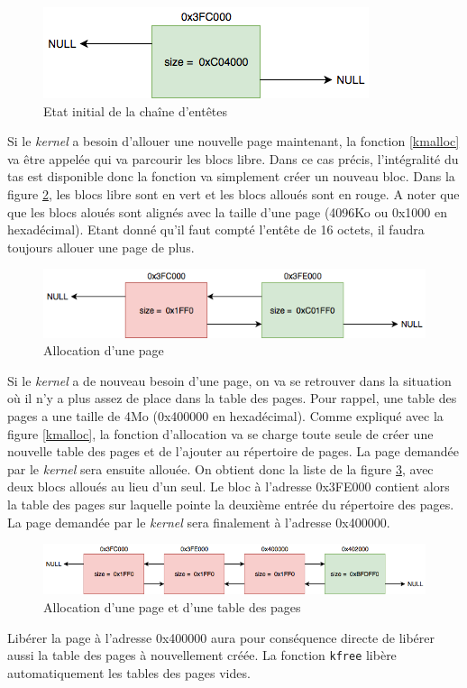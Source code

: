 \begin{figure}[!h]
  \centering
  \includegraphics[scale=0.7]{images/alloc0.png}
  \caption{Etat initial de la chaîne d'entêtes}
  \label{alloc0}
\end{figure}

Si le \textit{kernel} a besoin d'allouer une nouvelle page maintenant, la fonction
\ref{kmalloc} va être appelée qui va parcourir les blocs libre. Dans ce cas précis,
l'intégralité du tas est disponible donc la fonction va simplement créer un nouveau
bloc. Dans la figure \ref{alloc1}, les blocs libre sont en vert et les blocs alloués
sont en rouge. A noter que que les blocs aloués sont alignés avec la taille d'une
page (4096Ko ou 0x1000 en hexadécimal). Etant donné qu'il faut compté l'entête
de 16 octets, il faudra toujours allouer une page de plus.

\begin{figure}[!h]
  \centering
  \includegraphics[scale=0.6]{images/alloc1.png}
  \caption{Allocation d'une page}
  \label{alloc1}
\end{figure}

Si le \textit{kernel} a de nouveau besoin d'une page, on va se retrouver dans la
situation où il n'y a plus assez de place dans la table des pages. Pour rappel,
une table des pages a une taille de 4Mo (0x400000 en hexadécimal). Comme expliqué
avec la figure \ref{kmalloc}, la fonction d'allocation va se charge toute seule
de créer une nouvelle table des pages et de l'ajouter au répertoire de pages.
La page demandée par le \textit{kernel} sera ensuite allouée. On obtient donc
la liste de la figure \ref{alloc2}, avec deux blocs alloués au lieu d'un seul.
Le bloc à l'adresse 0x3FE000 contient alors la table des pages sur laquelle pointe
la deuxième entrée du répertoire des pages. La page demandée par le \textit{kernel}
sera finalement à l'adresse 0x400000.

\begin{figure}[!h]
  \centering
  \includegraphics[scale=0.6]{images/alloc2.png}
  \caption{Allocation d'une page et d'une table des pages}
  \label{alloc2}
\end{figure}

Libérer la page à l'adresse 0x400000 aura pour conséquence directe de libérer aussi
la table des pages à nouvellement créée. La fonction \texttt{kfree} libère
automatiquement les tables des pages vides.